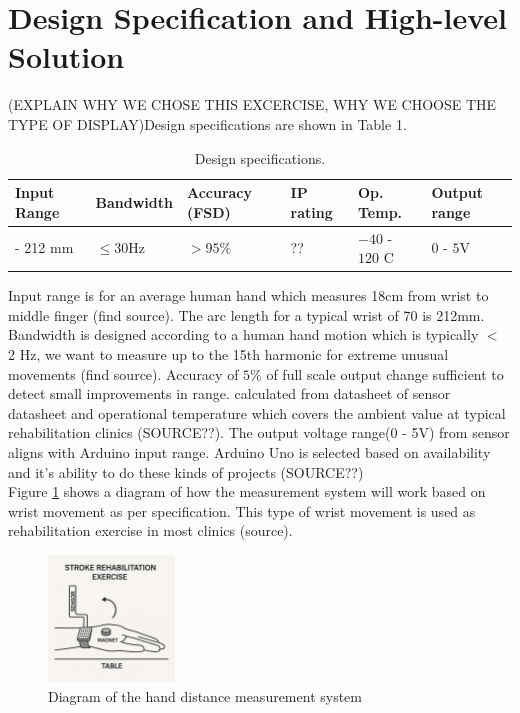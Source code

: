 \documentclass[a4paper,12pt]{article}
\begin{document}
%
\section{Design Specification and High-level Solution}
(EXPLAIN WHY WE CHOSE THIS EXCERCISE, WHY WE CHOOSE THE TYPE OF DISPLAY)Design specifications are shown in Table 1. 
\begin{table}[ht]
\centering
\caption{Design specifications.}
\begin{tabular}{|>{\centering\arraybackslash}p{2.2cm}|>{\centering\arraybackslash}p{2.5cm}|>{\centering\arraybackslash}p{2cm}|>{\centering\arraybackslash}p{1.5cm}|>{\centering\arraybackslash}p{2.5cm}|>{\centering\arraybackslash}p{2.5cm}|}
\hline
\textbf{Input Range} & \textbf{Bandwidth} & \textbf{Accuracy (FSD)} & \textbf{IP rating} & \textbf{Op. Temp.} & \textbf{Output range} \\
\hline
0 - 212 mm & $\leq 30 \text{Hz}$ & $>95\%$ & ?? & $-40$ - $120$ \textdegree{}C & $0$ - $5 \text{V}$  \\
\hline
\end{tabular}
\end{table}
Input range is for an average human hand which measures 18cm from wrist to middle finger (find source). The arc length for a typical wrist of 70\textdegree{} is 212mm. Bandwidth is designed according to a human hand motion which is typically $<$ 2 Hz, we want to measure up to the 15th harmonic for extreme unusual movements (find source). Accuracy of $5\%$ of full scale output change sufficient to detect small improvements in range. calculated from datasheet of sensor datasheet and operational temperature which covers the ambient value at typical rehabilitation clinics (SOURCE??). The output voltage range(0 - 5V) from sensor aligns with Arduino input range. Arduino Uno is selected based on availability and it's ability to do these kinds of projects (SOURCE??)\\
Figure \ref{fig:measure_diag} shows a diagram of how the measurement system will work based on wrist movement as per specification. This type of wrist movement is used as rehabilitation exercise in most clinics (source).
\begin{figure}[!ht]
    \centering
    \includegraphics[width=0.3\textwidth]{diagram-Measure.png}
    \caption{Diagram of the hand distance measurement system}
    \label{fig:measure_diag}
\end{figure}
\end{document}
